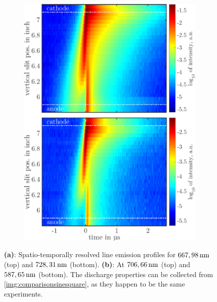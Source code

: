 \documentclass[a4paper,10pt,twoside]{article}
\newcommand{\fett}[1]{\textbf{#1}}
\begin{document}
\begin{figure}
\begin{subfigure}[t]{0.49\textwidth}
					\includegraphics[width=\textwidth]{figures/lineratio/combinations/korr706over587.pdf}
					\caption*{}
					\label{img:706u587nm}
				\end{subfigure}
				\caption{\fett{(a)}: Spatio-temporally resolved line emission profiles for $\unit[667,98]{nm}$ (top) and $\unit[728,31]{nm}$ (bottom). \fett{(b)}: At $\unit[706,66]{nm}$ (top) and $\unit[587,65]{nm}$ (bottom). The discharge properties can be collected from \autoref{img:comparisonsinesquare}, as they happen to be the same experiments.}
				\label{img:comparisonemissionline}
			\end{figure}
			
\end{document}
